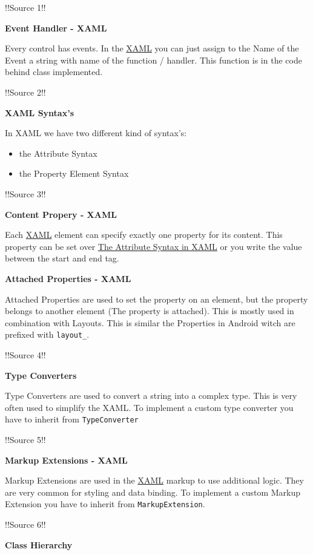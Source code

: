 \documentclass[10pt,twoside,landscape]{article}
\begin{document}
\begin{multicols}{4}
!!Source 1!!

\textbf{Event Handler - XAML}

Every control has events.
In the \href{../../../roam/20211123162058-xaml.org}{XAML} you can just assign to the Name of the Event a string with name of the function / handler.
This function is in the code behind class implemented.

!!Source 2!!


\textbf{XAML Syntax's}

In XAML we have two different kind of syntax's:
\begin{itemize}
\item the Attribute Syntax
\item the Property Element Syntax
\end{itemize}

!!Source 3!!

\textbf{Content Propery - XAML}

Each \href{../../../roam/20211123162058-xaml.org}{XAML} element can specify exactly one property for its content.
This property can be set over \href{../../../roam/20211207160947-the_attribute_syntax_in_xaml.org}{The Attribute Syntax in XAML} or you write the value between the start and end tag.


\textbf{Attached Properties - XAML}

Attached Properties are used to set the property on an element, but the property belongs to another element (The property is attached).
This is mostly used in combination with Layouts.
This is similar the Properties in Android witch are prefixed with \texttt{layout\_}.

!!Source 4!!


\textbf{Type Converters}

Type Converters are used to convert a string into a complex type.
This is very often used to simplify the XAML.
To implement a custom type converter you have to inherit from \texttt{TypeConverter}

!!Source 5!!

\textbf{Markup Extensions - XAML}

Markup Extensions are used in the \href{../../../roam/20211123162058-xaml.org}{XAML} markup to use additional logic.
They are very common for styling and data binding.
To implement a custom Markup Extension you have to inherit from \texttt{MarkupExtension}.

!!Source 6!!

\textbf{Class Hierarchy}


\end{multicols}
\end{document}
